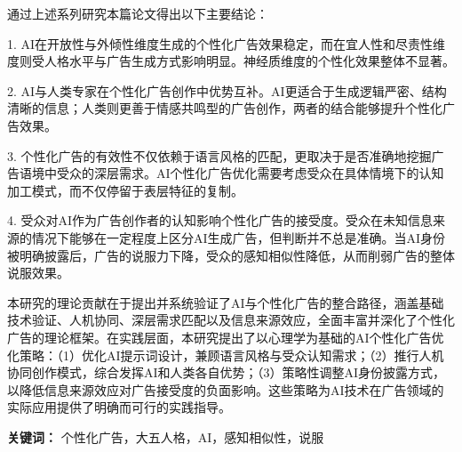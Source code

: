 通过上述系列研究本篇论文得出以下主要结论：

1. AI在开放性与外倾性维度生成的个性化广告效果稳定，而在宜人性和尽责性维度则受人格水平与广告生成方式影响明显。神经质维度的个性化效果整体不显著。

2. AI与人类专家在个性化广告创作中优势互补。AI更适合于生成逻辑严密、结构清晰的信息；人类则更善于情感共鸣型的广告创作，两者的结合能够提升个性化广告效果。

3. 个性化广告的有效性不仅依赖于语言风格的匹配，更取决于是否准确地挖掘广告语境中受众的深层需求。AI个性化广告优化需要考虑受众在具体情境下的认知加工模式，而不仅停留于表层特征的复制。

4. 受众对AI作为广告创作者的认知影响个性化广告的接受度。受众在未知信息来源的情况下能够在一定程度上区分AI生成广告，但判断并不总是准确。当AI身份被明确披露后，广告的说服力下降，受众的感知相似性降低，从而削弱广告的整体说服效果。

本研究的理论贡献在于提出并系统验证了AI与个性化广告的整合路径，涵盖基础技术验证、人机协同、深层需求匹配以及信息来源效应，全面丰富并深化了个性化广告的理论框架。在实践层面，本研究提出了以心理学为基础的AI个性化广告优化策略：（1）优化AI提示词设计，兼顾语言风格与受众认知需求；（2）推行人机协同创作模式，综合发挥AI和人类各自优势；（3）策略性调整AI身份披露方式，以降低信息来源效应对广告接受度的负面影响。这些策略为AI技术在广告领域的实际应用提供了明确而可行的实践指导。

\vspace{1cm}

\textbf{关键词：} 个性化广告，大五人格，AI，感知相似性，说服

\clearpage
\pagestyle{empty}
\thispagestyle{empty}
